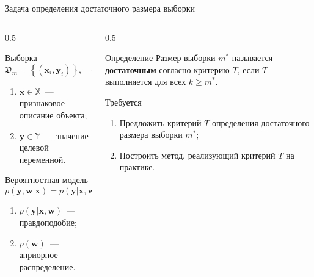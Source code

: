 \documentclass[aspectratio=169]{beamer}
\begin{document}
\begin{frame}{Задача определения достаточного размера выборки}
    \begin{columns}[T]
        \begin{column}{0.5\textwidth}
            \begin{block}{Выборка}
                \vspace{-0.5em}
                \[
                    \mathfrak{D}_m = \left\{ (\mathbf{x}_i, \mathbf{y}_i) \right\}, \quad i = 1, \ldots, m
                \]
                \vspace{-1.5em}
                \begin{enumerate}
                    \item $\mathbf{x} \in \mathbb{X}$~--- признаковое описание объекта;
                    \item $\mathbf{y} \in \mathbb{Y}$~--- значение целевой переменной.
                \end{enumerate}
            \end{block}
            \vfill
            \begin{block}{Вероятностная модель}
                \vspace{-1.5em}
                \[
                    p(\mathbf{y}, \mathbf{w} | \mathbf{x}) = p(\mathbf{y} | \mathbf{x}, \mathbf{w}) p(\mathbf{w}): \mathbb{Y} \times \mathbb{W} \times \mathbb{X} \to \mathbb{R}^+
                \]
                \vspace{-2em}
                \begin{enumerate}
                    \item $p(\mathbf{y} | \mathbf{x}, \mathbf{w})$~--- правдоподобие;
                    \item $p(\mathbf{w})$~--- априорное распределение.
                \end{enumerate}
            \end{block}
        \end{column}
        \begin{column}{0.5\textwidth}
            \begin{block}{Определение}
                \vspace{0.5em}
                Размер выборки $m^*$ называется \alert{\textbf{достаточным}} согласно критерию $T$, если $T$ выполняется для всех $k \geqslant m^*$.
            \end{block}
            \vspace{3em}
            \begin{block}{Требуется}
                \vspace{0.5em}
                \begin{enumerate}
                    \item Предложить критерий $T$ определения достаточного размера выборки $m^*$;
                    \item Построить метод, реализующий критерий $T$ на практике.
                \end{enumerate}
            \end{block}
        \end{column}
    \end{columns}
\end{frame}
\end{document}
